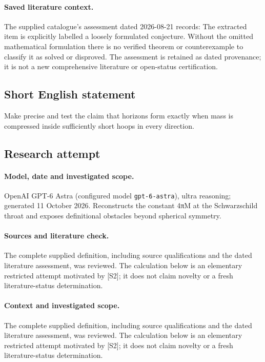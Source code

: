 \documentclass[11pt]{article}
\begin{document}
\paragraph{Saved literature context.} The supplied catalogue's assessment dated 2026-08-21 records: The extracted item is explicitly labelled a loosely formulated conjecture. Without the omitted mathematical formulation there is no verified theorem or counterexample to classify it as solved or disproved. The assessment is retained as dated provenance; it is not a new comprehensive literature or open-status certification.
\subsection{Short English statement}
Make precise and test the claim that horizons form exactly when mass is compressed inside sufficiently short hoops in every direction.
\subsection{Research attempt}
\paragraph{Model, date and investigated scope.}
OpenAI GPT-6 Astra (configured model \texttt{gpt-6-astra}), ultra reasoning; generated 11 October 2026. Reconstructs the constant 4πM at the Schwarzschild throat and exposes definitional obstacles beyond spherical symmetry.

\paragraph{Sources and literature check.}
The complete supplied definition, including source qualifications and the dated literature assessment, was reviewed. The calculation below is an elementary restricted attempt motivated by [S2]; it does not claim novelty or a fresh literature-status determination.

\paragraph{Context and investigated scope.} The complete supplied definition, including source qualifications and the dated literature assessment, was reviewed. The calculation below is an elementary restricted attempt motivated by [S2]; it does not claim novelty or a fresh literature-status determination.
\end{document}
